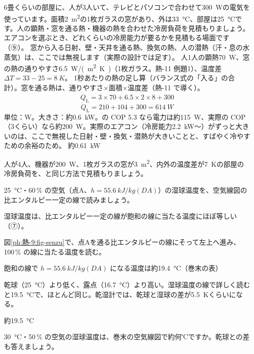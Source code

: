 \begin{phreidai}[部屋の冷房負荷を見積もる]
\label{ph:熱-9:ex9}6畳くらいの部屋に、人が3人いて、テレビとパソコンで合わせて\qty{300}{W}の電気を使っています。面積\qty{2}{m^2}の1枚ガラスの窓があり、外は\qty{33}{\celsius}、部屋は\qty{25}{\celsius}です。人の顕熱・窓を通る熱・機器の熱を合わせた冷房負荷を見積もりましょう。
\phbamen
エアコンを選ぶとき、どれくらいの冷房能力が要るかを見積もる場面です（⑨）。
\phmushi
窓から入る日射、壁・天井を通る熱、換気の熱、人の潜熱（汗・息の水蒸気）は、ここでは無視します（実際の設計では足す）。
\phzu
人1人の顕熱\qty{70}{W}、窓の熱の通りやすさ\qty{6.5}{W/(m^2.K)}（1枚ガラス。熱-11 例題1）、温度差 $\Delta T=33-25=\qty{8}{K}$。
\phriyu
1秒あたりの熱の足し算（バランス式の「入る」の合計）。窓を通る熱は、通りやすさ×面積×温度差（熱-11 で導く）。
\phtateru
\[ \dot Q_{\mathrm L}=3\times70+6.5\times2\times8+300 \]
\phtoku
\[ \dot Q_{\mathrm L}=210+104+300=\qty{614}{W} \]
\phtashikame
単位：W。大きさ：約\qty{0.6}{kW}。の COP 5.3 なら電力は約\qty{115}{W}、実際の COP（3くらい）なら約\qty{200}{W}。実際のエアコン（冷房能力\qty{2.2}{kW}〜）がずっと大きいのは、ここで無視した日射・壁・換気・潜熱が大きいことと、すばやく冷やすための余裕のため。
\kotae 約\qty{0.61}{kW}
\end{phreidai}
\begin{jibun}
人が4人、機器が\qty{200}{W}、1枚ガラスの窓が\qty{3}{m^2}、内外の温度差が\qty{7}{K}の部屋の冷房負荷を、と同じ方法で見積もりましょう。
\end{jibun}

\begin{reidai}[空気線図で湿球温度を読む]
\label{ph:熱-9:ex10}\qty{25}{\celsius}・60\,\% の空気（点A、$h=\qty{55.6}{kJ/kg(DA)}$）の湿球温度を、空気線図の比エンタルピー一定の線で読みましょう。
\par{} 湿球温度は、比エンタルピー一定の線が飽和の線に当たる温度にほぼ等しい（⑦）。
\par\kangaekata 図\ref{ph:熱-9:fig-senzu}で、点Aを通る比エンタルピーの線にそって左上へ進み、100\,\% の線に当たる温度を読む。
\par\shiki 飽和の線で $h=\qty{55.6}{kJ/kg(DA)}$ になる温度は約\qty{19.4}{\celsius}（巻末の表）
\par{} 乾球（\qty{25}{\celsius}）より低く、露点（\qty{16.7}{\celsius}）より高い。湿球温度の線で詳しく読むと\qty{19.5}{\celsius}で、ほとんど同じ。乾湿計では、乾球と湿球の差が\qty{5.5}{K}くらいになる。
\par\kotae 約\qty{19.5}{\celsius}
\end{reidai}
\begin{jibun}
\qty{30}{\celsius}・50\,\% の空気の湿球温度は、巻末の空気線図で約何℃ですか。乾球との差も答えましょう。
\end{jibun}


